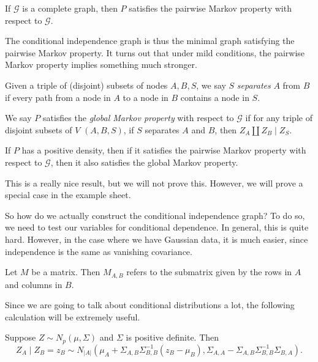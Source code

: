 \documentclass[a4paper]{article}
\begin{document}
\begin{eg}
  If $\mathcal{G}$ is a complete graph, then $P$ satisfies the pairwise Markov property with respect to $\mathcal{G}$.
\end{eg}

The conditional independence graph is thus the minimal graph satisfying the pairwise Markov property. It turns out that under mild conditions, the pairwise Markov property implies something much stronger.

\begin{defi}[Separates]
  Given a triple of (disjoint) subsets of nodes $A, B, S$, we say $S$ \emph{separates} $A$ from $B$ if every path from a node in $A$ to a node in $B$ contains a node in $S$.
\end{defi}

\begin{defi}
  We say $P$ satisfies the \emph{global Markov property} with respect to $\mathcal{G}$ if for any triple of disjoint subsets of $V$ $(A, B, S)$, if $S$ separates $A$ and $B$, then $Z_A \amalg Z_B \mid Z_S$.
\end{defi}

\begin{prop}
  If $P$ has a positive density, then if it satisfies the pairwise Markov property with respect to $\mathcal{G}$, then it also satisfies the global Markov property.
\end{prop}
This is a really nice result, but we will not prove this. However, we will prove a special case in the example sheet.

So how do we actually construct the conditional independence graph? To do so, we need to test our variables for conditional dependence. In general, this is quite hard. However, in the case where we have Gaussian data, it is much easier, since independence is the same as vanishing covariance.

\begin{notation}[$M_{A,B}$]
  Let $M$ be a matrix. Then $M_{A,B}$ refers to the submatrix given by the rows in $A$ and columns in $B$.
\end{notation}

Since we are going to talk about conditional distributions a lot, the following calculation will be extremely useful.
\begin{prop}
  Suppose $Z \sim N_p(\mu, \Sigma)$ and $\Sigma$ is positive definite. Then
  \[
    Z_A \mid Z_B = z_B \sim N_{|A|}(\mu_A + \Sigma_{A, B} \Sigma_{B, B}^{-1}(z_B - \mu_B), \Sigma_{A, A} - \Sigma_{A, B} \Sigma_{B, B}^{-1} \Sigma_{B, A}).
  \]
\end{prop}
\end{document}
